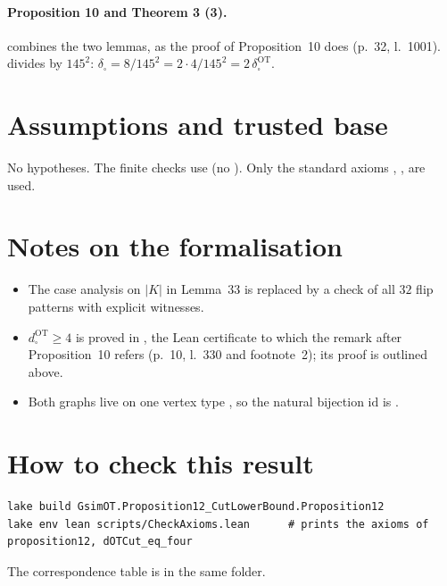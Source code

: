 \paragraph{Proposition 10 and Theorem 3 (3).}  combines the two lemmas, as the proof of
Proposition~10 does (p.~32, l.~1001).  divides by
$145^2$: $\delta_\square=8/145^2=2\cdot4/145^2=2\,\delta^{\mathrm{OT}}_\square$.

\section{Assumptions and trusted base}
No hypotheses. The finite checks use  (no ). Only the standard axioms
, ,  are used.

\section{Notes on the formalisation}
\begin{itemize}
\item The case analysis on $|K|$ in Lemma~33 is replaced by a check of all $32$ flip patterns with explicit witnesses.
\item $d^{\mathrm{OT}}_\square\ge4$ is proved in , the Lean certificate to which the remark after
Proposition~10 refers (p.~10, l.~330 and footnote~2); its proof is outlined above.
\item Both graphs live on one vertex type , so the natural bijection $\mathrm{id}$ is .
\end{itemize}

\section{How to check this result}
\begin{verbatim}
lake build GsimOT.Proposition12_CutLowerBound.Proposition12
lake env lean scripts/CheckAxioms.lean      # prints the axioms of proposition12, dOTCut_eq_four
\end{verbatim}
The correspondence table is  in the same folder.

